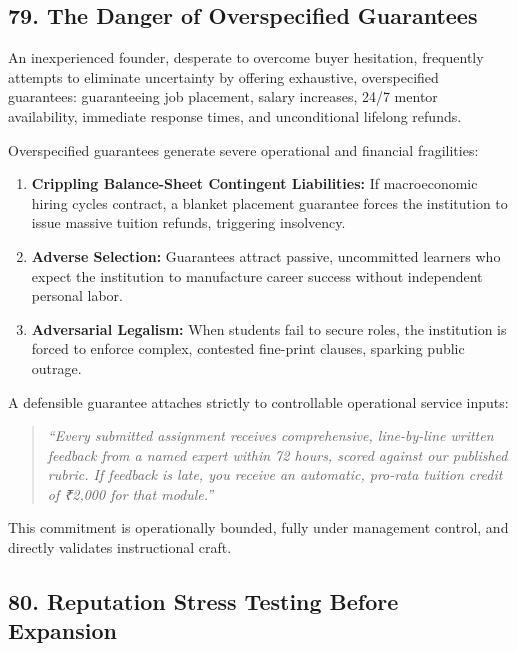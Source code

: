 \subsection*{79. The Danger of Overspecified Guarantees}

An inexperienced founder, desperate to overcome buyer hesitation, frequently attempts to eliminate uncertainty by offering exhaustive, overspecified guarantees: guaranteeing job placement, salary increases, 24/7 mentor availability, immediate response times, and unconditional lifelong refunds.

Overspecified guarantees generate severe operational and financial fragilities:
\begin{enumerate}
\item \textbf{Crippling Balance-Sheet Contingent Liabilities:} If macroeconomic hiring cycles contract, a blanket placement guarantee forces the institution to issue massive tuition refunds, triggering insolvency.
\item \textbf{Adverse Selection:} Guarantees attract passive, uncommitted learners who expect the institution to manufacture career success without independent personal labor.
\item \textbf{Adversarial Legalism:} When students fail to secure roles, the institution is forced to enforce complex, contested fine-print clauses, sparking public outrage.
\end{enumerate}

A defensible guarantee attaches strictly to controllable operational service inputs:
\begin{quote}
\textit{``Every submitted assignment receives comprehensive, line-by-line written feedback from a named expert within 72 hours, scored against our published rubric. If feedback is late, you receive an automatic, pro-rata tuition credit of ₹2,000 for that module.''}
\end{quote}
This commitment is operationally bounded, fully under management control, and directly validates instructional craft.

\subsection*{80. Reputation Stress Testing Before Expansion}

